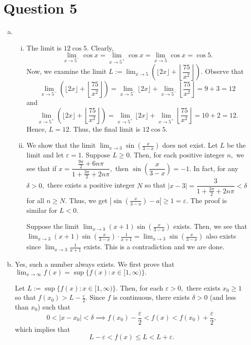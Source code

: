 \documentclass{article}
\begin{document}
\section*{Question 5}
\begin{enumerate}[(a)]
    \item \begin{enumerate}[(i)]
        \item The limit is $12\cos 5.$ Clearly, $$\lim_{x\to 5^-}\cos x=\lim_{x\to 5^+}\cos x=\lim_{x\to 5}\cos x=\cos 5.$$
        Now, we examine the limit $L:=\displaystyle\lim_{x\to 5}\left(\lfloor2x\rfloor+\left\lfloor\dfrac{75}{x^2}\right\rfloor\right).$ Observe that $$\lim_{x\to 5^-}\left(\lfloor2x\rfloor+\left\lfloor\dfrac{75}{x^2}\right\rfloor\right)=\lim_{x\to 5^-}\lfloor2x\rfloor+\lim_{x\to 5^-}\left\lfloor\dfrac{75}{x^2}\right\rfloor=9+3=12$$
        and $$\lim_{x\to 5^+}\left(\lfloor2x\rfloor+\left\lfloor\dfrac{75}{x^2}\right\rfloor\right)=\lim_{x\to 5^+}\lfloor2x\rfloor+\lim_{x\to 5^+}\left\lfloor\dfrac{75}{x^2}\right\rfloor=10+2=12.$$
        Hence, $L=12.$ Thus, the final limit is $12\cos5.$
        \item We show that the limit $\displaystyle\lim_{x\to3}\sin\left(\frac{x}{3-x}\right)$ does not exist. Let $L$ be the limit and let $\varepsilon=1$. Suppose $L\geq 0.$ Then, for each positive integer $n,$ we see that if $x=\dfrac{\frac{9\pi}{2}+6n\pi}{1+\frac{3\pi}{2}+2n\pi},$ then $\sin\left(\dfrac{x}{3-x}\right)=-1.$ In fact, for any $\delta>0,$ there exists a positive integer $N$ so that $|x-3|=\dfrac{3}{1+\frac{3\pi}{2}+2n\pi}<\delta$ for all $n\geq N.$ Thus, we get $\displaystyle\left|\sin\left(\frac{x}{3-x}\right)-a\right|\geq1=\varepsilon.$  The proof is similar for $L<0.$
        
        Suppose the limit $\displaystyle\lim_{x\to3}(x+1)\sin\left(\frac{x}{3-x}\right)$ exists. Then, we see that $\displaystyle\lim_{x\to3}(x+1)\sin\left(\frac{x}{3-x}\right)\cdot\frac{1}{x+1}=\displaystyle\lim_{x\to3}\sin\left(\frac{x}{3-x}\right)$ also exists since $\displaystyle\lim_{x\to3}\frac{1}{x+1}$ exists. This is a contradiction and we are done.
    \end{enumerate}
    \item Yes, such a number always exists. We first prove that $\displaystyle\lim_{x\to\infty}f(x)=\sup\{f(x):x\in[1,\infty)\}.$
    
    Let $L:=\sup\{f(x):x\in[1,\infty)\}.$ Then, for each $\varepsilon>0,$ there exists $x_0\geq 1$ so that $f(x_0)>L-\frac{\varepsilon}{2}.$ Since $f$ is continuous, there exists $\delta>0$ (and less than $x_0$) such that $$0<|x-x_0|<\delta\implies f(x_0)-\frac{\varepsilon}{2}<f(x)<f(x_0)+\frac{\varepsilon}{2},$$
    which implies that $$L-\varepsilon<f(x)\leq L<L+\varepsilon.$$
    

\end{enumerate}
\end{document}

